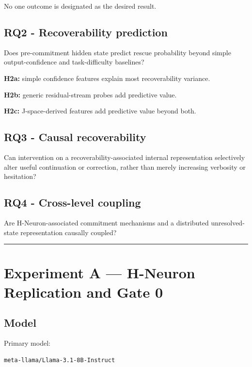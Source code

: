 No one outcome is designated as the desired result.

\subsection{RQ2 - Recoverability prediction}\label{rq2---recoverability-prediction}

Does pre-commitment hidden state predict rescue probability beyond simple output-confidence and task-difficulty baselines?

\textbf{H2a:} simple confidence features explain most recoverability variance.

\textbf{H2b:} generic residual-stream probes add predictive value.

\textbf{H2c:} J-space-derived features add predictive value beyond both.

\subsection{RQ3 - Causal recoverability}\label{rq3---causal-recoverability}

Can intervention on a recoverability-associated internal representation selectively alter useful continuation or correction, rather than merely increasing verbosity or hesitation?

\subsection{RQ4 - Cross-level coupling}\label{rq4---cross-level-coupling}

Are H-Neuron-associated commitment mechanisms and a distributed unresolved-state representation causally coupled?

\begin{center}\rule{0.5\linewidth}{0.5pt}\end{center}

\section{Experiment A --- H-Neuron Replication and Gate 0}\label{experiment-a-h-neuron-replication-and-gate-0}

\subsection{Model}\label{model}

Primary model:

\passthrough{\lstinline!meta-llama/Llama-3.1-8B-Instruct!}

